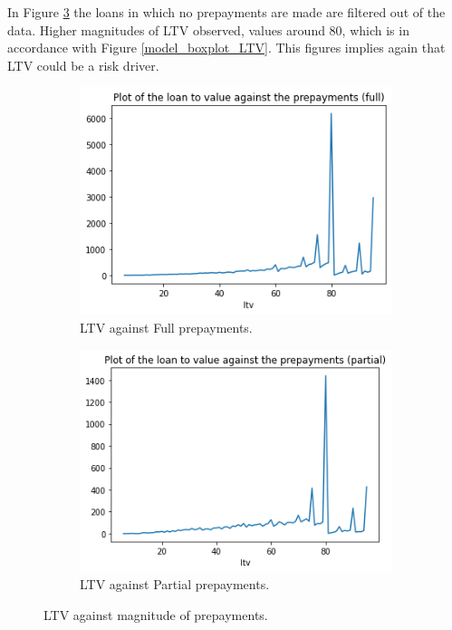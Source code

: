         In Figure \ref{model_LTV_against_prepayment} the loans in which no prepayments are made are filtered out of the data. Higher magnitudes of LTV  observed, values around 80, which is in accordance with Figure \ref{model_boxplot_LTV}. This figures implies again that LTV could be a risk driver. 
        \begin{figure}[H]
            \centering
            \begin{subfigure}{0.45\textwidth}
                \includegraphics[width=\linewidth]{Latex/Report/Figures/LTV againts Full prepayments.png}
                \caption{LTV against Full prepayments.}
                \label{model_LTV_against_full_prepayment}
            \end{subfigure}
            \begin{subfigure}{0.45\textwidth}
                \includegraphics[width=\linewidth]{Latex/Report/Figures/LTV againts Partial prepayments.png}
                \caption{LTV against Partial prepayments.}
                \label{model_LTV_against_partial_prepayment}
            \end{subfigure}
            \caption{LTV against magnitude of prepayments.}
            \label{model_LTV_against_prepayment}
        \end{figure}
    
